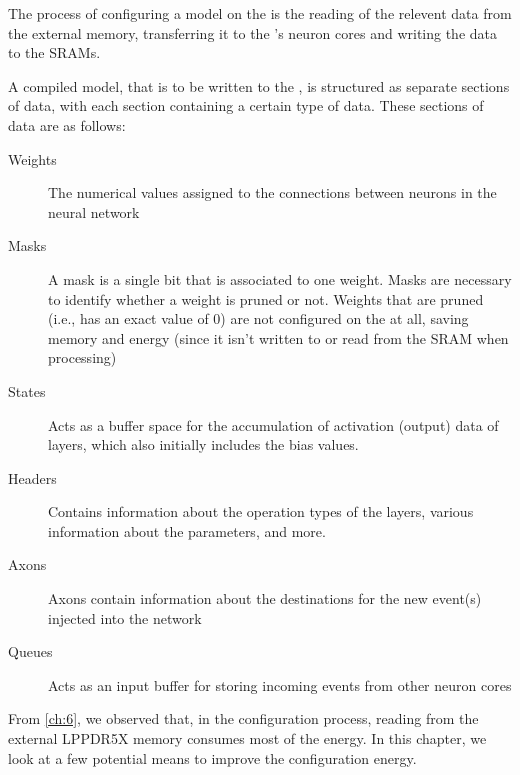 The process of configuring a model on the \graicore{} is the reading of the relevent data from the external memory, transferring it to the \graicore{}'s neuron cores and writing the data to the SRAMs.

A compiled model, that is to be written to the \graicore{}, is structured as separate sections of data, with each section containing a certain type of data.
These sections of data are as follows:
\begin{description}
    \item[Weights] 
    The numerical values assigned to the connections between neurons in the neural network
    \item[Masks] 
    A mask is a single bit that is associated to one weight.
    Masks are necessary to identify whether a weight is pruned or not.
    Weights that are pruned (i.e., has an exact value of $0$) are not configured on the \graicore{} at all, saving memory and energy (since it isn't written to or read from the SRAM when processing)
    \item[States] 
    Acts as a buffer space for the accumulation of activation (output) data of layers, which also initially includes the bias values.
    \item[Headers] 
    Contains information about the operation types of the layers, various information about the parameters, and more.
    \item[Axons] 
    Axons contain information about the destinations for the new event(s) injected into the network
    \item[Queues] 
    Acts as an input buffer for storing incoming events from other neuron cores 
\end{description}

From \cref{ch:6}, we observed that, in the configuration process, reading from the external LPPDR5X memory consumes most of the energy.
In this chapter, we look at a few potential means to improve the configuration energy.
